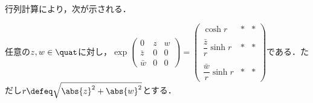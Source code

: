 \begin{nttdef}
\end{nttdef}

行列計算により，次が示される．
\begin{lem}\label{lem:exp-quat}
  
  任意の$ z,w\in \quat$に対し，$\exp
  \begin{pmatrix}
    0 & z & w  \\
    \bar{z} & 0 & 0\\
    \bar{w} & 0 & 0
  \end{pmatrix}
  =
  \begin{pmatrix}
    \cosh r &  \ast & \ast \\
    \\
    \dfrac{\bar{z}}{r} \sinh r &  \ast & \ast \\
    \\
    \dfrac{\bar{w}}{r}\sinh r &  \ast & \ast 
  \end{pmatrix}
  $である．ただし$r \defeq \sqrt{\abs{z}^2 + \abs{w}^2 } $とする．
\end{lem}

